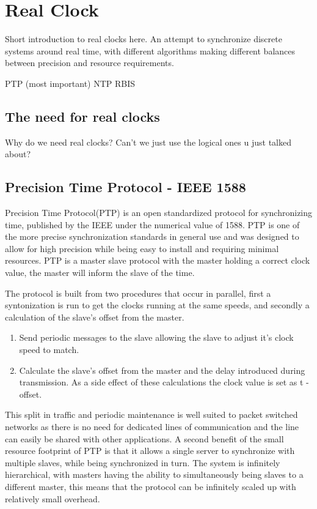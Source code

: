 \section{Real Clock}\label{sc:realClock}

Short introduction to real clocks here.
An attempt to synchronize discrete systems around real time, with different algorithms making different balances between precision and resource requirements.

PTP (most important)
NTP
RBIS

\subsection{The need for real clocks}

Why do we need real clocks? Can't we just use the logical ones u just talked about?

\subsection{Precision Time Protocol - IEEE 1588}

Precision Time Protocol(PTP) is an open standardized protocol for synchronizing time, published by the IEEE under the numerical value of 1588. PTP is one of the more precise synchronization standards in general use and was designed to allow for high precision while being easy to install and requiring minimal resources. PTP is a master slave protocol with the master holding a correct clock value, the master will inform the slave of the time.

The protocol is built from two procedures that occur in parallel, first a syntonization is run to get the clocks running at the same speeds, and secondly a calculation of the slave's offset from the master. 
\begin{enumerate}
\item Send periodic messages to the slave allowing the slave to adjust it's clock speed to match.
\item Calculate the slave's offset from the master and the delay introduced during transmission. As a side effect of these calculations the clock value is set as t - offset.
\end{enumerate}

This split in traffic and periodic maintenance is well suited to packet switched networks as there is no need for dedicated lines of communication and the line can easily be shared with other applications. A second benefit of the small resource footprint of PTP is that it allows a single server to synchronize with multiple slaves, while being synchronized in turn. The system is infinitely hierarchical, with masters having the ability to simultaneously being slaves to a different master, this means that the protocol can be infinitely scaled up with relatively small overhead.




